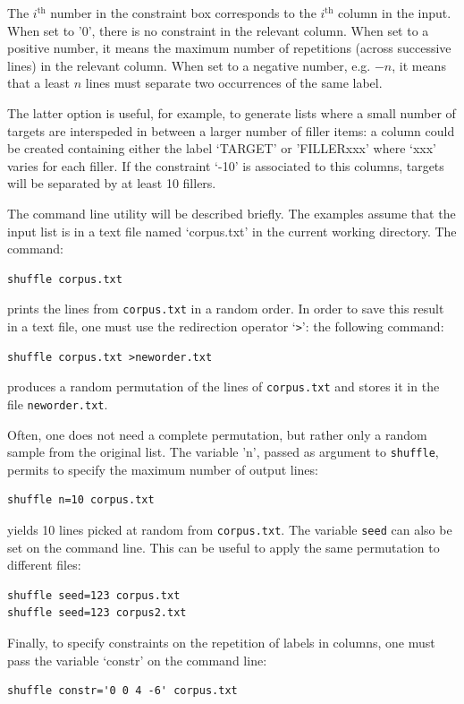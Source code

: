 \documentclass[doc]{apa}
\newcommand{\shuffle}{\texttt{shuffle}}
\begin{document}
The \textit{$i^{\mbox{th}}$} number in the constraint box corresponds to the
\textit{$i^{\mbox{th}}$} column in the input. When set to '0', there is no
constraint in the relevant column. When set to a positive number, it means
the maximum number of repetitions (across successive lines) in the relevant
column. When set to a negative number, e.g. $-n$, it means that a least $n$
lines must separate two occurrences of the same label.

The latter option is useful, for example, to generate lists where a small
number of targets are interspeded in between a larger number of filler items:
a column could be created containing either the label `TARGET' or 'FILLERxxx'
where `xxx' varies for each filler. If the constraint `-10' is associated to
this columns, targets will be separated by at least 10 fillers.

The command line utility will be described briefly. The examples assume that
the input list is in a text file named `corpus.txt' in the current working
directory. The command:
\begin{verbatim}
shuffle corpus.txt
\end{verbatim}  
prints the lines from \verb|corpus.txt| in a random order. In
order to save this result in a text file, one must use the redirection
operator `\verb|>|': the following command: 
\begin{verbatim}
shuffle corpus.txt >neworder.txt
\end{verbatim}
produces a random permutation of the lines of \verb|corpus.txt| and stores it
in the file \verb|neworder.txt|.

Often, one does not need a complete permutation, but rather only a
random sample from the original list. The variable 'n', passed as
argument to \shuffle{}, permits to specify the maximum number of
output lines:
\begin{verbatim}
shuffle n=10 corpus.txt
\end{verbatim}
yields 10 lines picked at random from \verb|corpus.txt|. The variable
\texttt{seed} can also be set on the command line. This can be useful to apply
the same permutation to different files:
\begin{verbatim}
shuffle seed=123 corpus.txt
shuffle seed=123 corpus2.txt
\end{verbatim}

Finally, to specify constraints on the repetition of labels in columns, one
must pass the variable `constr' on the command line:
\begin{verbatim}
shuffle constr='0 0 4 -6' corpus.txt
\end{verbatim}
\end{document}
